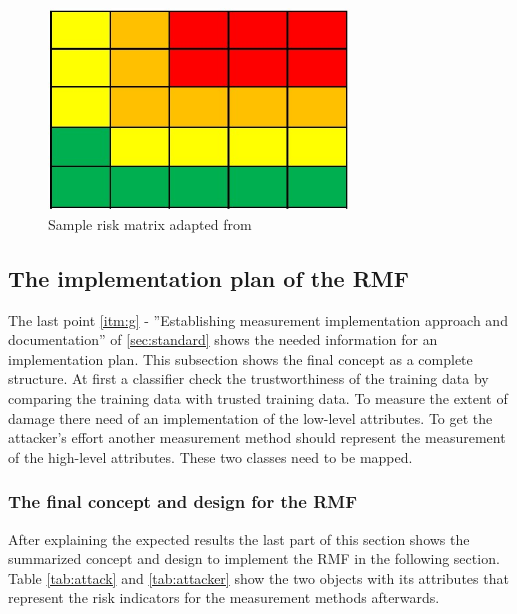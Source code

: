 \begin{figure}[ht!]
  \centering
  \includegraphics[width=8cm]{pictures/sample_matrix.jpg}
  \caption{Sample risk matrix adapted from \cite{Ivanenko2020IMPLEMENTATIONOR}}
  \label{fig:sample_matrix}
\end{figure}

\subsection{The implementation plan of the RMF}
\label{sec:final_design}

The last point \ref{itm:g} - ''Establishing measurement implementation approach and documentation'' of \ref{sec:standard} shows the needed information for an implementation plan. This subsection shows the final concept as a complete structure. At first a classifier check the trustworthiness of the training data by comparing the training data with trusted training data. To measure the extent of damage there need of an implementation of the low-level attributes. To get the attacker's effort another measurement method should represent the measurement of the high-level attributes. These two classes need to be mapped.

\subsubsection*{The final concept and design for the RMF}

After explaining the expected results the last part of this section shows the summarized concept and design to implement the RMF in the following section. Table \ref{tab:attack} and \ref{tab:attacker} show the two objects with its attributes that represent the risk indicators for the measurement methods afterwards.

